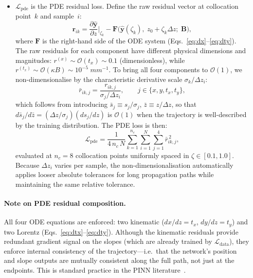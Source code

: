 \documentclass[a4paper,11pt]{article}
\newcommand{\mm}{mm}
\newcommand{\dz}{\Delta z}
\newcommand{\Bfield}{\mathbf{B}}
\newcommand{\loss}{\mathcal{L}}
\begin{document}
\begin{itemize}
  \item $\loss_\text{pde}$ is the PDE residual loss.  Define the raw
    residual vector at collocation point~$k$ and sample~$i$:
    \begin{equation}
      \mathbf{r}_{ik} = \frac{\partial\hat{\mathbf{y}}}{\partial z}
        \bigg|_{\zeta_k}
        - \mathbf{F}\bigl(\hat{\mathbf{y}}(\zeta_k),\;
          z_0 + \zeta_k\dz;\; \Bfield\bigr),
      \label{eq:pde_raw_residual}
    \end{equation}
    where $\mathbf{F}$ is the right-hand side of the ODE system
    (Eqs.~\ref{eq:dx}--\ref{eq:dty}).  The raw residuals for each
    component have different physical dimensions and magnitudes:
    $r^{(x)} \sim \mathcal{O}(t_x) \sim 0.1$ (dimensionless),
    while $r^{(t_x)} \sim \mathcal{O}(\kappa B) \sim 10^{-5}\;\mm^{-1}$.
    To bring all four components to $\mathcal{O}(1)$, we
    non-dimensionalise by the characteristic derivative scale
    $\sigma_k / \dz_i$:
    \begin{equation}
      \bar{r}_{ik,j} = \frac{r_{ik,j}}{\sigma_j / \dz_i},
      \qquad j \in \{x, y, t_x, t_y\},
      \label{eq:pde_nondim}
    \end{equation}
    which follows from introducing $\bar{s}_j \equiv s_j / \sigma_j$,
    $\bar{z} \equiv z / \dz$, so that $d\bar{s}_j/d\bar{z} =
    (\dz/\sigma_j)(ds_j/dz)$ is $\mathcal{O}(1)$ when the trajectory is
    well-described by the training distribution.  The PDE loss is then:
    \begin{equation}
      \loss_\text{pde} = \frac{1}{4\,n_c\,N}\sum_{k=1}^{n_c}\sum_{i=1}^{N}
        \sum_{j=1}^{4} \bar{r}_{ik,j}^{\,2},
      \label{eq:loss_pde}
    \end{equation}
    evaluated at $n_c = 8$ collocation points uniformly spaced in
    $\zeta \in [0.1, 1.0]$.  Because $\dz_i$ varies per sample, the
    non-dimensionalisation automatically applies looser absolute
    tolerances for long propagation paths while maintaining the same
    relative tolerance.
\end{itemize}

\paragraph{Note on PDE residual composition.}
All four ODE equations are enforced: two kinematic ($dx/dz = t_x$,
$dy/dz = t_y$) and two Lorentz
(Eqs.~\ref{eq:dtx}--\ref{eq:dty}).  Although the kinematic residuals
provide redundant gradient signal on the slopes (which are already
trained by $\loss_\text{data}$), they enforce internal consistency of
the trajectory---i.e.\ that the network's position and slope outputs
are mutually consistent along the full path, not just at the endpoints.
This is standard practice in the PINN literature~\cite{Raissi2019}.
\end{document}

